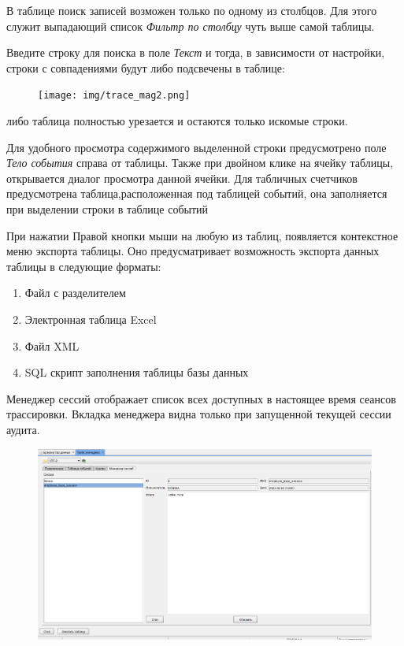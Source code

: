 
В таблице поиск записей возможен только по одному из столбцов. Для этого служит выпадающий список \textit{Фильтр по столбцу} чуть выше самой таблицы. 

Введите строку для поиска в поле \textit{Текст} и тогда, в зависимости от настройки, строки с совпадениями будут либо подсвечены в таблице:
\begin{figure}[H]
	\centering
	\texttt{[image: img/trace\_mag2.png]}
\end{figure}
\noindent либо таблица полностью урезается и остаются только искомые строки.


Для удобного просмотра содержимого выделенной строки предусмотрено поле \textit{Тело события} справа от таблицы. Также при двойном клике на ячейку таблицы, открывается диалог просмотра данной ячейки. Для табличных счетчиков предусмотрена таблица,расположенная под таблицей событий, она заполняется при выделении строки в таблице событий

При нажатии Правой кнопки мыши на любую из таблиц, появляется контекстное меню экспорта таблицы. Оно предусматривает возможность экспорта данных таблицы в следующие форматы:
\begin{enumerate}[leftmargin=20pt]
	\item Файл с разделителем
	\item Электронная таблица Excel
	\item Файл XML
	\item SQL скрипт заполнения таблицы базы данных
\end{enumerate}
	

Менеджер сессий отображает список всех доступных в настоящее время сеансов трассировки. Вкладка менеджера видна только при запущенной текущей сессии аудита. 

\begin{figure}[H]
	\centering
	\includegraphics[width = 0.85\linewidth]{img/session_manager.png}
\end{figure}

